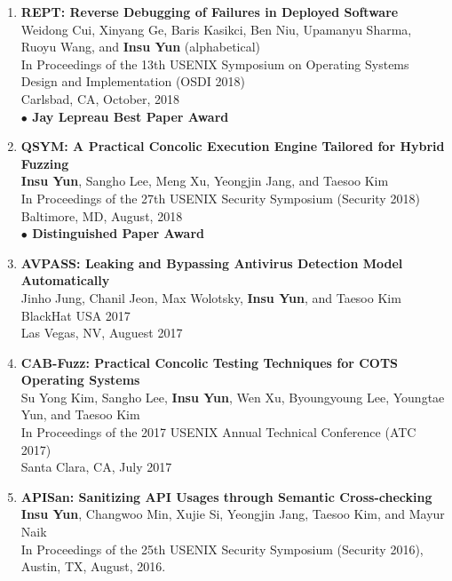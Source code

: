 \documentclass[11pt,letterpaper]{article}
\begin{document}
\begin{enumerate}
  \item \textbf{REPT: Reverse Debugging of Failures in Deployed Software} \\
  {\footnotesize
    Weidong Cui, Xinyang Ge, Baris Kasikci, Ben Niu, Upamanyu Sharma, Ruoyu Wang, and \textbf{Insu Yun} (alphabetical) \\
    In Proceedings of the 13th USENIX Symposium on Operating Systems Design and Implementation (OSDI 2018) \\
    Carlsbad, CA, October, 2018 \\
    \textbf{$\bullet$ Jay Lepreau Best Paper Award}
  }
  \item \textbf{QSYM: A Practical Concolic Execution Engine Tailored for Hybrid Fuzzing} \\
  {\footnotesize
    \textbf{Insu Yun}, Sangho Lee, Meng Xu, Yeongjin Jang, and Taesoo Kim \\
    In Proceedings of the 27th USENIX Security Symposium (Security 2018) \\
    Baltimore, MD, August, 2018 \\
    \textbf{$\bullet$ Distinguished Paper Award}
  }
  \item \textbf{AVPASS: Leaking and Bypassing Antivirus Detection Model Automatically} \\
  {\footnotesize
    Jinho Jung, Chanil Jeon, Max Wolotsky, \textbf{Insu Yun}, and Taesoo Kim \\
    BlackHat USA 2017 \\
    Las Vegas, NV, Auguest 2017
  }
  \item \textbf{CAB-Fuzz: Practical Concolic Testing Techniques for COTS Operating Systems} \\
  {\footnotesize
    Su Yong Kim, Sangho Lee, \textbf{Insu Yun}, Wen Xu, Byoungyoung Lee, Youngtae Yun, and Taesoo Kim \\
    In Proceedings of the 2017 USENIX Annual Technical Conference (ATC 2017) \\
    Santa Clara, CA, July 2017 
  }
  \item \textbf{APISan: Sanitizing API Usages through Semantic Cross-checking} \\
  {\footnotesize
     \textbf{Insu Yun}, Changwoo Min, Xujie Si, Yeongjin Jang, Taesoo Kim, and Mayur Naik \\
     In Proceedings of the 25th USENIX Security Symposium (Security 2016), \\
     Austin, TX, August, 2016. \\
}
\end{enumerate}
\end{document}
